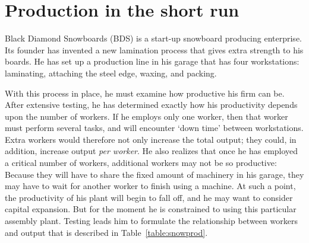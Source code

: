 \section{Production in the short run}\label{sec:ch8sec3}

Black Diamond Snowboards (BDS) is a start-up snowboard producing enterprise. Its founder has invented a new lamination process that gives extra strength to his boards. He has set up a production line in his garage that has four workstations: laminating, attaching the steel edge, waxing, and packing. 

With this process in place, he must examine how productive his firm can be. After extensive testing, he has determined exactly how his productivity depends upon the number of workers. If he employs only one worker, then that worker must perform several tasks, and will encounter `down time' between workstations. Extra workers would therefore not only increase the total output; they could, in addition, increase output \textit{per worker}. He also realizes that once he has employed a critical number of workers, additional workers may not be so productive: Because they will have to share the fixed amount of machinery in his garage, they may have to wait for another worker to finish using a machine. At such a point, the productivity of his plant will begin to fall off, and he may want to consider capital expansion. But for the moment he is constrained to using this particular assembly plant. Testing leads him to formulate the relationship between workers and output that is described in Table~\ref{table:snowprod}.


